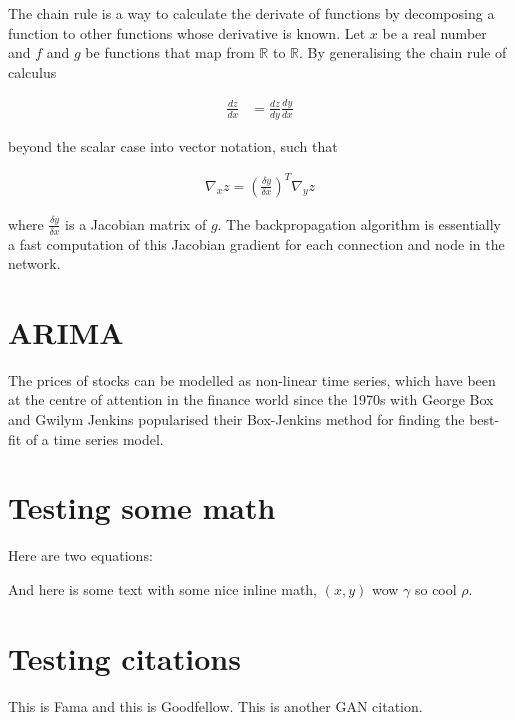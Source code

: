 \newcommand{\R}{\mathbb{R}}

The chain rule is a way to calculate the derivate of functions by decomposing a function to other functions whose derivative is known. Let $x$ be a real number and $f$ and $g$ be functions that map from $\R$ to $\R$. By generalising the chain rule of calculus

\begin{align}
    \frac{dz}{dx} &= \frac{dz}{dy}\frac{dy}{dx}
\end{align}

beyond the scalar case into vector notation, such that 

\begin{align}
    \nabla_{x}z = (\frac{\delta y}{\delta x})^T \nabla_{y}z
\end{align}

where $\frac{\delta y}{\delta x}$ is a Jacobian matrix of $g$. The backpropagation algorithm is essentially a fast computation of this Jacobian gradient for each connection and node in the network\cite{goodfellow_backprop}.

\section{ARIMA}
The prices of stocks can be modelled as non-linear time series, which have been at the centre of attention in the finance world since the 1970s with George Box and Gwilym Jenkins popularised their Box-Jenkins method for finding the best-fit of a time series model\cite{box_jenkins}.

\section{Testing some math}
Here are two equations:





And here is some text with some nice inline math, $(x, y)$ wow $\gamma$ so cool $\rho$.


\section{Testing citations}
This is Fama\cite{fama_efficient_market} and this is Goodfellow.
This is another GAN citation.
